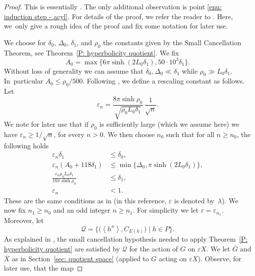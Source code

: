 \documentclass[11pt]{article}
\let\mathcal\mathscr
\theoremstyle{plain}
\theoremstyle{definition}
\newcommand{\q}[1]{\overline{#1}}
\begin{document}
\begin{proof}
This is essentially \cite[Prop.\,7.1]{coulon_geometry_2014}. The only additional observation is point \eqref{enu: induction step - acyl}. For details of the proof, we refer the reader to \cite{coulon_geometry_2014}.
Here, we~only give a rough idea of the proof and fix some notation for later use.

We choose for $\delta_0$, $\Delta_0$, $\delta_1$, and $\rho_0$ the constants given by the Small Cancellation Theorem, see Theorem~\ref{P: hyperbolicity quotient}.
We fix
\begin{equation*}
A_0 = \max\{6\pi \sinh(2L_0\delta_1), 50\cdot 10^3\delta_1\}.
\end{equation*}
Without loss of generality we can assume that $\delta_0, \Delta_0 \ll \delta_1$ while $\rho_0 \gg L_0\delta_1$.
In~particular $A_0 \leq \rho_0/500$.
Following \cite[pp.\,319]{coulon_geometry_2014}, we define a rescaling constant as follows. Let
\[
\varepsilon_n= \frac{8 \pi \sinh \rho_0 }{\sqrt{\rho_0 L_0 \delta_1}}\, \frac{1}{\sqrt{n}}.
\]
We note for later use that if $\rho_0$ is sufficiently large (which we assume here) we have $\varepsilon_n \geq 1/\sqrt n$, for every $n > 0$.
We then choose $n_0$ such that for all $n \geq n_0$, the following holds
\begin{align}
\varepsilon_n \delta_1 & \leq \delta_0, \\
\label{eqn: def epsilon}
\varepsilon_n (A_0 + 118\delta_1) & \leq \min\{ \Delta_0, \pi \sinh(2 L_0\delta_1)\}, \\
\frac{\varepsilon_n \rho_0L_0 \delta_1}{16 \pi \sinh \rho_0} & \leq \delta_1,\\
\varepsilon_n &< 1.
\end{align}
These are the same conditions as in \cite[p.\,319]{coulon_geometry_2014} (in this reference, $\varepsilon$ is denoted by~$\lambda$).
We now fix $n_1 \geq n_0$ and an odd integer $n \geq n_1$.
For simplicity we let $\varepsilon = \varepsilon_{n_1}$.
Moreover, let
\begin{equation*}
\mathcal Q=\bigl\{\bigl(\left<h^n\right>,C_{E(h)} \bigr)\mid h\in P \bigr\}.
\end{equation*}
As explained in \cite[Lem.\,7.2]{coulon_geometry_2014}, the small cancellation hypothesis needed to apply Theorem~\ref{P: hyperbolicity quotient} are satisfied by $\mathcal Q$ for the action of $G$ on $\varepsilon X$.
We let $\q G$ and $\q {X}$ as in Section~\ref{sec: quotient space} (applied to $G$ acting on $\varepsilon X$).
Observe, for later use, that the map

\end{proof}
\end{document}
